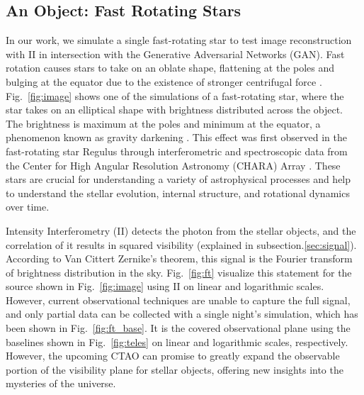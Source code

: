 \subsection{An Object: Fast Rotating Stars}
In our work, we simulate a single fast-rotating star to test image reconstruction with II in intersection with the Generative Adversarial Networks (GAN). Fast rotation causes stars to take on an oblate shape, flattening at the poles and bulging at the equator due to the existence of stronger centrifugal force \citep{von1924radiative, 1999A&A...347..185M}. Fig.~\ref{fig:image} shows one of the simulations of a fast-rotating star, where the star takes on an elliptical shape with brightness distributed across the object. The brightness is maximum at the poles and minimum at the equator, a phenomenon known as gravity darkening \citep{lucy1967gravity}. This effect was first observed in the fast-rotating star Regulus through interferometric and spectroscopic data from the Center for High Angular Resolution Astronomy (CHARA) Array \citep{mcalister2005first}. These stars are crucial for understanding a variety of astrophysical processes and help to understand the stellar evolution, internal structure, and rotational dynamics over time.

Intensity Interferometry (II) detects the photon from the stellar objects, and the correlation of it results in squared visibility (explained in subsection.\ref{sec:signal}). According to Van Cittert Zernike's theorem, this signal is the Fourier transform of brightness distribution in the sky. Fig.~\ref {fig:ft} visualize this statement for the source shown in Fig.~\ref{fig:image} using II on linear and logarithmic scales. However, current observational techniques are unable to capture the full signal, and only partial data can be collected with a single night's simulation, which has been shown in Fig.~\ref{fig:ft_base}. It is the covered observational plane using the baselines shown in Fig.~\ref{fig:teles} on linear and logarithmic scales, respectively. However, the upcoming CTAO can promise to greatly expand the observable portion of the visibility plane for stellar objects, offering new insights into the mysteries of the universe.